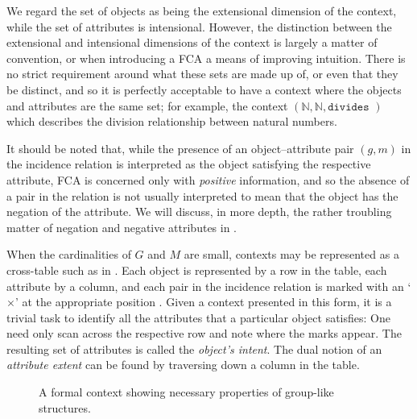 We regard the set of objects as being the extensional dimension of the context, while the set of attributes is
intensional. However, the distinction between the extensional and intensional dimensions of the context is largely a
matter of convention, or when introducing a FCA a means of improving intuition. There is no strict requirement around
what these sets are made up of, or even that they be distinct, and so it is perfectly acceptable to have a context where
the objects and attributes are the same set; for example, the context $(\mathbb{N}, \mathbb{N}, \texttt{divides })$
which describes the division relationship between natural numbers.

It should be noted that, while the presence of an object--attribute pair $(g,m)$ in the incidence relation is
interpreted as the object satisfying the respective attribute, FCA is concerned only with \textit{positive} information,
and so the absence of a pair in the relation is not usually interpreted to mean that the object has the negation of the attribute.
We will discuss, in more depth, the rather troubling matter of negation and negative attributes in
.

When the cardinalities of $G$ and $M$ are small, contexts may be represented as a cross-table such as in .
Each object is represented by a row in the table, each attribute by a column, and each pair in the incidence relation is
marked with an `$\times$' at the appropriate position \cite[pp. 17]{ganter1999formal}. Given a context presented in this
form, it is a trivial task to identify all the attributes that a particular object satisfies: One need only scan across the
respective row and note where the marks appear. The resulting set of attributes is called the \textit{object's intent}.
The dual notion of an \textit{attribute extent} can be found by traversing down a column in the table.

\begin{figure}[H]
	\centering
	\small
	\begin{cxt}
		\label{cxt:grouplikes}   
		    
		   
		   
	\end{cxt}
	\caption{A formal context showing necessary properties of group-like structures.}
	\label{context:formal-context-group-structures}
\end{figure}

